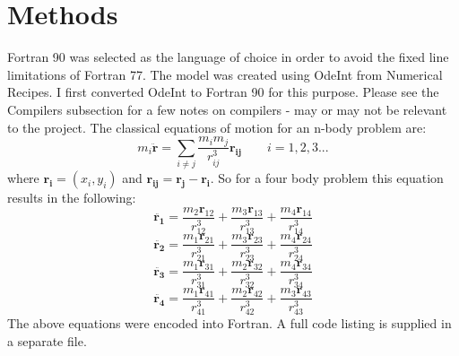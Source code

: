 \documentclass[a4paper,12pt]{article}
\begin{document}
\section{Methods}
Fortran 90 was selected as the language of choice in order to avoid the fixed line limitations of Fortran 77.
The model was created using OdeInt from Numerical Recipes. I first converted OdeInt to Fortran 90 for this purpose.
Please see the Compilers subsection for a few notes on compilers - may or may not be relevant to the project.
\newline
The classical equations of motion for an n-body problem are:
\begin{equation}
m_i\mathbf{\ddot{r}}=\sum_{i\neq{j}}\frac{{m_i}{m_j}}{r^3_{ij}}\mathbf{r_{ij}}
\qquad
i=1,2,3...
\end{equation}
where $\mathbf{r_i}=\left(x_i,y_i\right)$ and $\mathbf{r_{ij}}=\mathbf{r_j}-\mathbf{r_i}$. So for a four body problem 
this equation results in the following:
\begin{equation}
\ddot{\mathbf{r_1}}=\frac{m_2\mathbf{r}_{12}}{r^3_{12}}+\frac{m_3\mathbf{r}_{13}}{r^3_{13}}+\frac{m_4\mathbf{r}_{14}}{r^3_{14}}
\end{equation}
\begin{equation}
\ddot{\mathbf{r_2}}=\frac{m_1\mathbf{r}_{21}}{r^3_{21}}+\frac{m_3\mathbf{r}_{23}}{r^3_{23}}+\frac{m_4\mathbf{r}_{24}}{r^3_{24}}
\end{equation}
\begin{equation}
\ddot{\mathbf{r_3}}=\frac{m_1\mathbf{r}_{31}}{r^3_{31}}+\frac{m_2\mathbf{r}_{32}}{r^3_{32}}+\frac{m_4\mathbf{r}_{34}}{r^3_{34}}
\end{equation}
\begin{equation}
\ddot{\mathbf{r_4}}=\frac{m_1\mathbf{r}_{41}}{r^3_{41}}+\frac{m_2\mathbf{r}_{42}}{r^3_{42}}+\frac{m_3\mathbf{r}_{43}}{r^3_{43}}
\end{equation}
The above equations were encoded into Fortran. A full code listing is supplied in a separate file.
\end{document}
